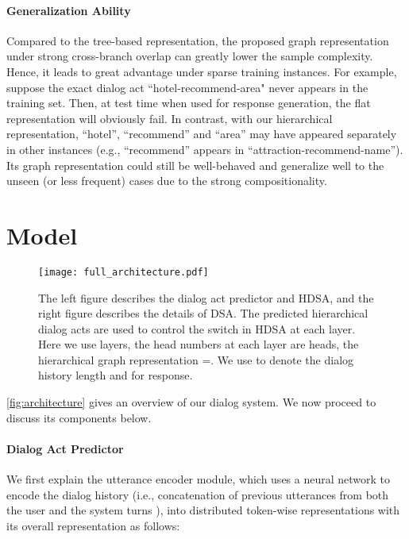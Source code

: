 \documentclass[11pt,a4paper]{article}
\begin{document}
\paragraph{Generalization Ability}
Compared to the tree-based representation, the proposed graph representation under strong cross-branch overlap can greatly lower the sample complexity. Hence, it leads to great advantage under sparse training instances. For example, suppose the exact dialog act ``hotel-recommend-area" never appears in the training set. Then, at test time when used for response generation, the flat representation will obviously fail. In contrast, with our hierarchical representation, ``hotel'', ``recommend'' and ``area'' may have appeared separately in other instances (e.g., ``recommend'' appears in ``attraction-recommend-name''). Its graph representation could still be well-behaved and generalize well to the unseen (or less frequent) cases due to the strong compositionality.




\section{Model}
\begin{figure*}[thb]
\begin{center}
    \texttt{[image: full\_architecture.pdf]}
    \end{center}
    \caption{The left figure describes the dialog act predictor and HDSA, and the right figure describes the details of DSA. The predicted hierarchical dialog acts are used to control the switch in HDSA at each layer. Here we use  layers, the head numbers at each layer are  heads, the hierarchical graph representation =. We use  to denote the dialog history length and  for response.}
    \label{fig:architecture}
\end{figure*}
\autoref{fig:architecture} gives an overview of our dialog system. We now proceed to discuss its components below.

\paragraph{Dialog Act Predictor}
We first explain the utterance encoder module, which uses a neural network  to encode the dialog history (i.e., concatenation of previous utterances from both the user and the system turns ), into distributed token-wise representations  with its overall representation  as follows:
\end{document}
